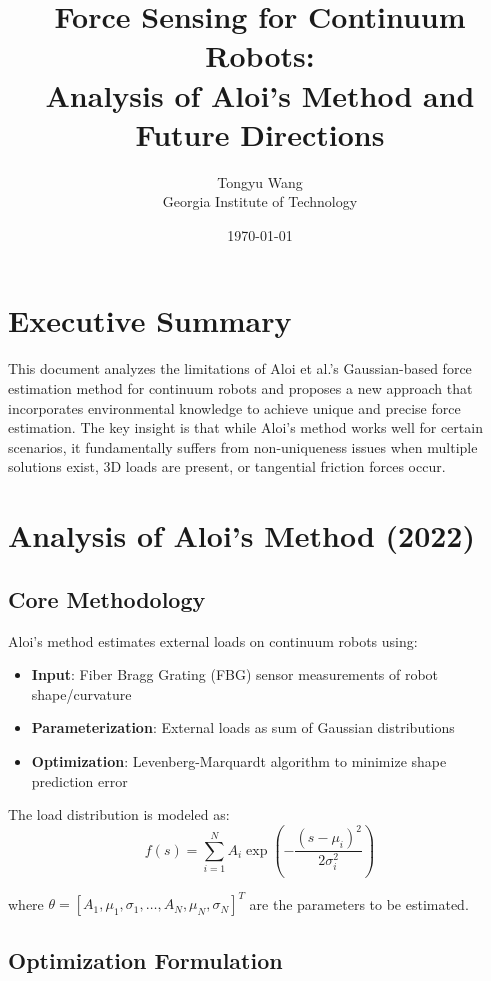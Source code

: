 \documentclass[11pt]{article}
\title{Force Sensing for Continuum Robots: \\
Analysis of Aloi's Method and Future Directions}
\author{Tongyu Wang\\Georgia Institute of Technology}
\date{\today}
\begin{document}
\maketitle

\section{Executive Summary}

This document analyzes the limitations of Aloi et al.'s Gaussian-based force estimation method for continuum robots and proposes a new approach that incorporates environmental knowledge to achieve unique and precise force estimation. The key insight is that while Aloi's method works well for certain scenarios, it fundamentally suffers from non-uniqueness issues when multiple solutions exist, 3D loads are present, or tangential friction forces occur.

\section{Analysis of Aloi's Method (2022)}

\subsection{Core Methodology}

Aloi's method estimates external loads on continuum robots using:
\begin{itemize}
    \item \textbf{Input}: Fiber Bragg Grating (FBG) sensor measurements of robot shape/curvature
    \item \textbf{Parameterization}: External loads as sum of Gaussian distributions
    \item \textbf{Optimization}: Levenberg-Marquardt algorithm to minimize shape prediction error
\end{itemize}

The load distribution is modeled as:
\begin{equation}
f(s) = \sum_{i=1}^{N} A_i \exp\left(-\frac{(s-\mu_i)^2}{2\sigma_i^2}\right)
\end{equation}

where $\theta = [A_1, \mu_1, \sigma_1, \ldots, A_N, \mu_N, \sigma_N]^T$ are the parameters to be estimated.

\subsection{Optimization Formulation}
\end{document}
